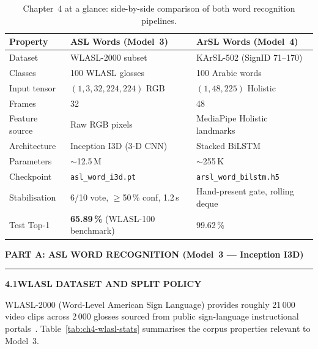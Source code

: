 \begin{table}[H]
\centering
\caption{Chapter~4 at a glance: side-by-side comparison of both word recognition pipelines.}
\label{tab:ch4-overview}
\small
\begin{tabular}{|P{3.0cm}|P{5.4cm}|P{5.4cm}|}
\hline
\textbf{Property} & \textbf{ASL Words (Model~3)} & \textbf{ArSL Words (Model~4)} \\
\hline
Dataset & WLASL-2000 subset & KArSL-502 (SignID 71--170) \\
Classes & 100 WLASL glosses & 100 Arabic words \\
Input tensor & $(1,3,32,224,224)$ RGB & $(1,48,225)$ Holistic \\
Frames & 32 & 48 \\
Feature source & Raw RGB pixels & MediaPipe Holistic landmarks \\
Architecture & Inception I3D (3-D CNN) & Stacked BiLSTM \\
Parameters & $\sim$12.5\,M & $\sim$255\,K \\
Checkpoint & \texttt{asl\_word\_i3d.pt} & \texttt{arsl\_word\_bilstm.h5} \\
Stabilisation & 6/10 vote, $\geq$50\,\% conf, 1.2\,s & Hand-present gate, rolling deque \\
Test Top-1 & \textbf{65.89\,\%} (WLASL-100 benchmark) & 99.62\,\% \\
\hline
\end{tabular}
\end{table}
\vspace{0.6cm}

\begin{center}
\large\textbf{PART A: ASL WORD RECOGNITION (Model~3 --- Inception I3D)}
\end{center}
\vspace{0.4cm}
\noindent\rule{\textwidth}{0.8pt}
\vspace{0.4cm}

\noindent\textbf{4.1\quad WLASL DATASET AND SPLIT POLICY}\par
{}
\vspace{0.4cm}

\noindent WLASL-2000 (Word-Level American Sign Language) provides roughly 21\,000 video clips across 2\,000 glosses sourced from public sign-language instructional portals~\cite{li2020wlasl,li2020wlaslgithub}. Table~\ref{tab:ch4-wlasl-stats} summarises the corpus properties relevant to Model~3.\par\vspace{0.4cm}

